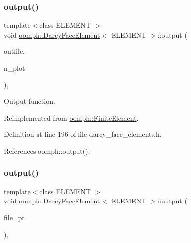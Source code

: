 \subsubsection{\texorpdfstring{output()}{output()}\hspace{0.1cm}{\footnotesize\ttfamily [2/4]}}
{\footnotesize\ttfamily template$<$class E\+L\+E\+M\+E\+NT $>$ \\
void \hyperlink{classoomph_1_1DarcyFaceElement}{oomph\+::\+Darcy\+Face\+Element}$<$ E\+L\+E\+M\+E\+NT $>$\+::output (\begin{DoxyParamCaption}\item[{std\+::ostream \&}]{outfile,  }\item[{const unsigned \&}]{n\+\_\+plot }\end{DoxyParamCaption})\hspace{0.3cm}{\ttfamily [inline]}, {\ttfamily [virtual]}}



Output function. 



Reimplemented from \hyperlink{classoomph_1_1FiniteElement_afa9d9b2670f999b43e6679c9dd28c457}{oomph\+::\+Finite\+Element}.



Definition at line 196 of file darcy\+\_\+face\+\_\+elements.\+h.



References oomph\+::output().

\mbox{\label{classoomph_1_1DarcyFaceElement_a5231113fc85a786c280ebfc4b316a19c}} 
\subsubsection{\texorpdfstring{output()}{output()}\hspace{0.1cm}{\footnotesize\ttfamily [3/4]}}
{\footnotesize\ttfamily template$<$class E\+L\+E\+M\+E\+NT $>$ \\
void \hyperlink{classoomph_1_1DarcyFaceElement}{oomph\+::\+Darcy\+Face\+Element}$<$ E\+L\+E\+M\+E\+NT $>$\+::output (\begin{DoxyParamCaption}\item[{F\+I\+LE $\ast$}]{file\+\_\+pt }\end{DoxyParamCaption})\hspace{0.3cm}{\ttfamily [inline]}, {\ttfamily [virtual]}}



